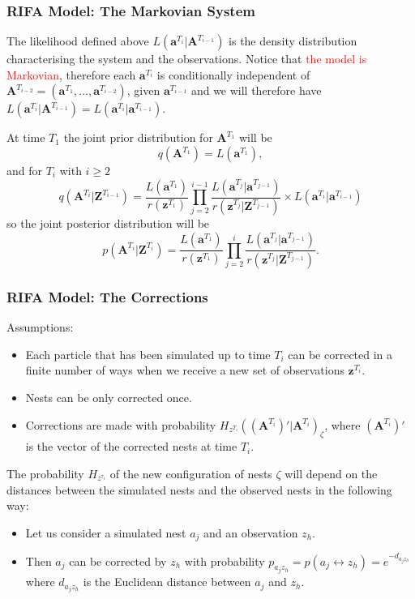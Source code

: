 \documentclass[9pt, xcolor={dvipsnames,svgnames,table}]{beamer}
\begin{document}
\begin{frame}
    \frametitle{RIFA Model: The Markovian System}
    \textcolor{PineGreen}{The likelihood defined above $L(\bm{a}^{T_i} | \bm{A}^{T_{i-1}})$ is the density distribution characterising the system and the observations}. Notice that \textcolor{Red}{the model is Markovian}, therefore each $\bm{a}^{T_i}$ is conditionally independent of $\bm{A}^{T_{i-2}} = (\bm{a}^{T_1}, \dots, \bm{a}^{T_{i-2}})$, given $\bm{a}^{T_{i-1}}$ and we will therefore have $L(\bm{a}^{T_i} | \bm{A}^{T_{i-1}}) = L(\bm{a}^{T_i} | \bm{a}^{T_{i-1}})$.
    
    At time $T_1$ the joint prior distribution for $\bm{A}^{T_1}$ will be
    \begin{equation*}
        q(\bm{A}^{T_1}) = L(\bm{a}^{T_1}),
    \end{equation*}
    and for $T_i$ with $i \geq 2$
    \begin{equation*}
        q(\bm{A}^{T_i} | \bm{Z}^{T_{i-1}}) =  \frac{L(\bm{a}^{T_1})}{r(\bm{z}^{T_1})} \prod_{j=2}^{i-1} \frac{L(\bm{a}^{T_j} | \bm{a}^{T_{j-1}})}{r(\bm{z}^{T_j} | \bm{Z}^{T_{j-1}})} \times L(\bm{a}^{T_i} | \bm{a}^{T_{i-1}})
    \end{equation*}
    so \textcolor{PineGreen}{the joint posterior distribution} will be
    \begin{equation*}
        p(\bm{A}^{T_i} | \bm{Z}^{T_i}) = \frac{L(\bm{a}^{T_1})}{r(\bm{z}^{T_1})} \prod_{j=2}^{i} \frac{L(\bm{a}^{T_j} | \bm{a}^{T_{j-1}})}{r(\bm{z}^{T_j} | \bm{Z}^{T_{j-1}})}.
    \end{equation*}
\end{frame}


\begin{frame}
    \frametitle{RIFA Model: The Corrections}
    Assumptions:
    \begin{itemize}
        \item Each particle that has been simulated up to time $T_i$ can be corrected in a finite number of ways when we receive a new set of observations $\bm{z}^{T_i}$.
        \item Nests can be only corrected once.
        \item Corrections are made with probability $H_{z^{T_i}}((\bm{A}^{T_i})' | \bm{A}^{T_i})_{\zeta}$, where $(\bm{A}^{T_i})'$ is the vector of the corrected nests at time $T_i$.
    \end{itemize}
    The probability $H_{z^{\tau_i}}$ of the new configuration of nests $\zeta$ will depend on the distances between the simulated nests and the observed nests in the following way:
    \begin{itemize}
        \item Let us consider a simulated nest $a_j$ and an observation $z_h$.
        \item Then $a_j$ can be corrected by $z_h$ with probability $p_{a_j z_h} = p(a_j \leftrightarrow z_h) = e^{-d_{a_j z_h}}$ where $d_{a_j z_h}$ is the Euclidean distance between $a_j$ and $z_h$.
    \end{itemize}
\end{frame}
\end{document}
